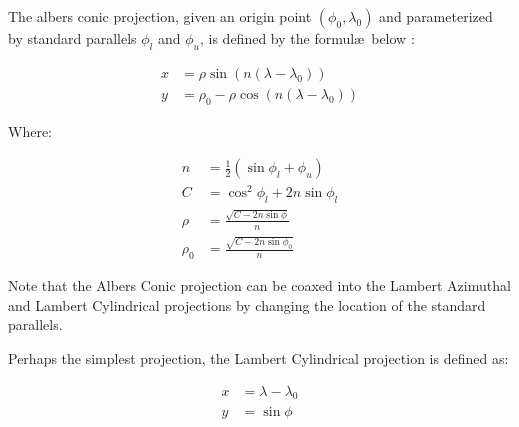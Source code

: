 
The albers conic projection, given an origin point $(\phi_0, \lambda_0)$
  and parameterized by standard parallels $\phi_l$ and $\phi_u$,
  is defined by the formul\ae\ below \cite{key:weisstein-albers}:

\def\th{ n \left( \lambda - \lambda_0 \right) }
\begin{align}
x &= \rho \sin ( \th ) \\
y &= \rho_0 - \rho \cos ( \th )
\end{align}

Where:

\begin{align*}
n &= \frac{1}{2} (\sin \phi_l + \phi_u) \\
C &= \cos^2 \phi_l + 2n\sin \phi_l \\
\rho &= \frac{
           \sqrt{ C - 2n \sin \phi }
         } { n } \\
\rho_0 &= \frac{
           \sqrt{ C - 2n \sin \phi_0 }
         } { n }
\end{align*}

Note that the Albers Conic projection can be coaxed into the Lambert Azimuthal
  and Lambert Cylindrical projections by changing the location of the standard
  parallels.

Perhaps the simplest projection, the Lambert Cylindrical projection is defined
  as:

\begin{align}
x &= \lambda - \lambda_0  \\
y &= \sin \phi
\end{align}

